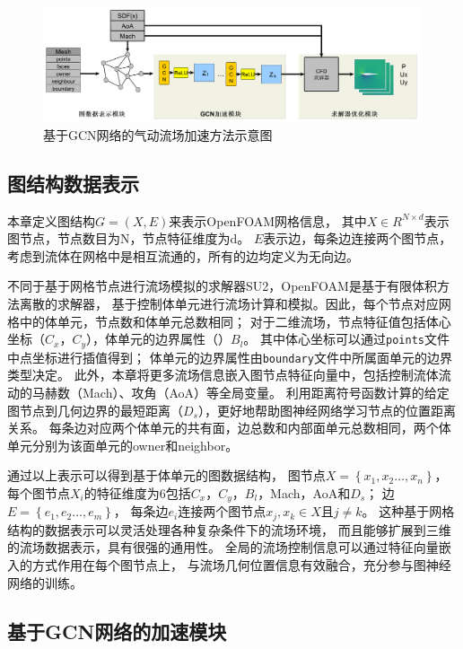 \begin{figure}[htp]
	\centering
	\includegraphics[width=0.99\textwidth]{figures/data/architecture2.pdf}
	\caption{基于GCN网络的气动流场加速方法示意图}
	\label{fig:gcnflow}
\end{figure}


\subsection{图结构数据表示}

本章定义图结构$G=\left(X, E\right)$来表示OpenFOAM网格信息，
其中$X \in R^{N \times d}$表示图节点，节点数目为N，节点特征维度为d。
$E$表示边，每条边连接两个图节点，考虑到流体在网格中是相互流通的，所有的边均定义为无向边。

不同于基于网格节点进行流场模拟的求解器SU2\cite{2015SU2}，OpenFOAM是基于有限体积方法离散的求解器，
基于控制体单元进行流场计算和模拟。因此，每个节点对应网格中的体单元，节点数和体单元总数相同；
对于二维流场，节点特征值包括体心坐标（$C_x$，$C_y$），体单元的边界属性（）$B_l$。
其中体心坐标可以通过\texttt{points}文件中点坐标进行插值得到；
体单元的边界属性由\texttt{boundary}文件中所属面单元的边界类型决定。
此外，本章将更多流场信息嵌入图节点特征向量中，包括控制流体流动的马赫数（Mach）、攻角（AoA）等全局变量。
利用距离符号函数计算的给定图节点到几何边界的最短距离（$D_s$），更好地帮助图神经网络学习节点的位置距离关系。
每条边对应两个体单元的共有面，边总数和内部面单元总数相同，两个体单元分别为该面单元的owner和neighbor。

通过以上表示可以得到基于体单元的图数据结构，
图节点$X=\left\{x_1, x_2 \ldots, x_n \right\}$，
每个图节点$X_i$的特征维度为6包括$C_x$，$C_y$，$B_l$，Mach，AoA和$D_s$；
边$E = \left\{e_1, e_2 \ldots, e_m \right\}$，
每条边$e_i$连接两个图节点$x_j,x_k \in X$且$j\not= k$。
这种基于网格结构的数据表示可以灵活处理各种复杂条件下的流场环境，
而且能够扩展到三维的流场数据表示，具有很强的通用性。
全局的流场控制信息可以通过特征向量嵌入的方式作用在每个图节点上，
与流场几何位置信息有效融合，充分参与图神经网络的训练。

\subsection{基于GCN网络的加速模块}



